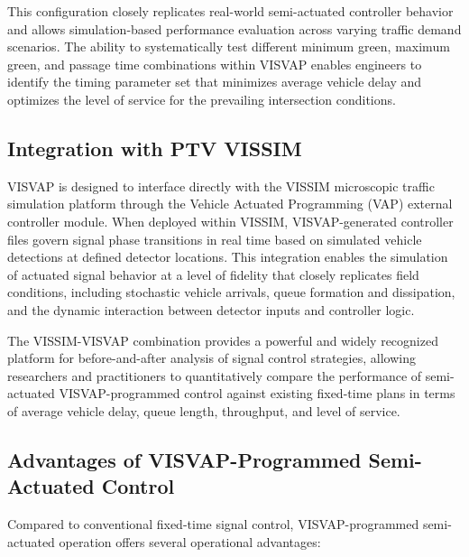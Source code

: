 This configuration closely replicates real-world semi-actuated 
controller behavior and allows simulation-based performance 
evaluation across varying traffic demand scenarios. The 
ability to systematically test different minimum green, 
maximum green, and passage time combinations within VISVAP 
enables engineers to identify the timing parameter set that 
minimizes average vehicle delay and optimizes the level of 
service for the prevailing intersection conditions.


\subsection{Integration with PTV VISSIM}

VISVAP is designed to interface directly with the VISSIM 
microscopic traffic simulation platform through the Vehicle 
Actuated Programming (VAP) external controller module. When 
deployed within VISSIM, VISVAP-generated controller files 
govern signal phase transitions in real time based on 
simulated vehicle detections at defined detector locations. 
This integration enables the simulation of actuated signal 
behavior at a level of fidelity that closely replicates 
field conditions, including stochastic vehicle arrivals, 
queue formation and dissipation, and the dynamic interaction 
between detector inputs and controller logic.

The VISSIM-VISVAP combination provides a powerful and widely 
recognized platform for before-and-after analysis of signal 
control strategies, allowing researchers and practitioners to 
quantitatively compare the performance of semi-actuated 
VISVAP-programmed control against existing fixed-time plans 
in terms of average vehicle delay, queue length, throughput, 
and level of service.



\subsection{Advantages of VISVAP-Programmed Semi-Actuated Control}

Compared to conventional fixed-time signal control, VISVAP-programmed 
semi-actuated operation offers several operational advantages:


